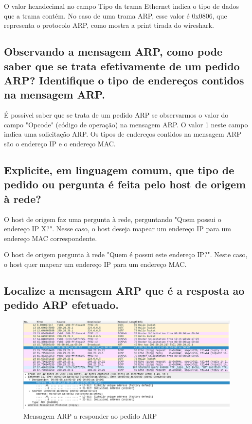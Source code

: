O valor hexadecimal no campo Tipo da trama Ethernet indica o tipo de dados que a trama contém. No caso de uma trama ARP, esse valor é 0x0806, que representa o protocolo ARP, como mostra a print tirada do wireshark.

\subsection{Observando a mensagem ARP, como pode saber que se trata efetivamente de um pedido ARP? Identifique o tipo de endereços contidos na mensagem ARP.}

É possível saber que se trata de um pedido ARP se observarmos o valor do campo "Opcode" (código de operação) na mensagem ARP. O valor 1 neste campo indica uma solicitação ARP. Os tipos de endereços contidos na mensagem ARP são o endereço IP e o endereço MAC.

\subsection{Explicite, em linguagem comum, que tipo de pedido ou pergunta é feita pelo host de origem à rede?}

O host de origem faz uma pergunta à rede, perguntando "Quem possui o endereço IP X?". Nesse caso, o host deseja mapear um endereço IP para um endereço MAC correspondente.

O host de origem pergunta à rede "Quem é possui este endereço IP?". Neste caso, o host quer mapear um endereço IP para um endereço MAC.

\subsection{Localize a mensagem ARP que é a resposta ao pedido ARP efetuado.}

\begin{figure} [h]
    \centering
    \includegraphics[width=1\linewidth]{resposta-arp-request.png}
    \caption{Mensagem ARP a responder ao pedido ARP}
    \label{fig:enter-label}
\end{figure}


